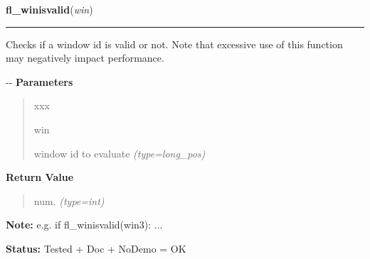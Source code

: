 \hspace{.8\funcindent}\begin{boxedminipage}{\funcwidth}

    \raggedright \textbf{fl\_winisvalid}(\textit{win})

    \vspace{-1.5ex}

    \rule{\textwidth}{0.5\fboxrule}
\setlength{\parskip}{2ex}

Checks if a window id is valid or not. Note that excessive use of
this function may negatively impact performance.

-{}-
\setlength{\parskip}{1ex}
      \textbf{Parameters}
      \vspace{-1ex}

      \begin{quote}
        \begin{Ventry}{xxx}

          \item[win]


window id to evaluate
            {\it (type=long\_pos)}

        \end{Ventry}

      \end{quote}

      \textbf{Return Value}
    \vspace{-1ex}

      \begin{quote}

num.
      {\it (type=int)}

      \end{quote}

\textbf{Note:} 
e.g. if fl\_winisvalid(win3): ...


\textbf{Status:} 
Tested + Doc + NoDemo = OK


    \end{boxedminipage}

    \label{xformslib:flxbasic:fl_wintitle}

    \vspace{0.5ex}

